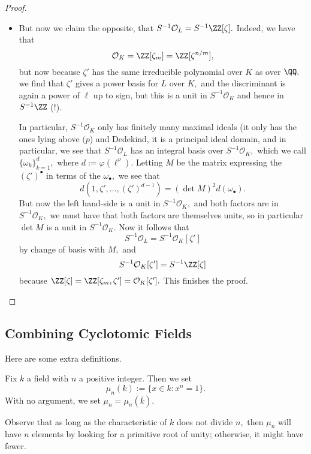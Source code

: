 \documentclass[../notes.tex]{subfiles}
\begin{document}
\begin{proof}
\begin{itemize}
		\item But now we claim the opposite, that $S^{-1}\mathcal O_L=S^{-1}\ZZ[\zeta].$ Indeed, we have that
		\[\mathcal O_K=\ZZ[\zeta_m]=\ZZ[\zeta^{n/m}],\]
		but now because $\zeta'$ has the same irreducible polynomial over $K$ as over $\QQ,$ we find that $\zeta'$ gives a power basis for $L$ over $K,$ and the discriminant is again a power of $\ell$ up to sign, but this is a unit in $S^{-1}\mathcal O_K$ and hence in $S^{-1}\ZZ$ (!).
		
		In particular, $S^{-1}\mathcal O_K$ only has finitely many maximal ideals (it only has the ones lying above $(p$) and Dedekind, it is a principal ideal domain, and in particular, we see that $S^{-1}\mathcal O_L$ has an integral basis over $S^{-1}\mathcal O_K,$ which we call $\{\omega_k\}_{k=1}^d,$ where $d:=\varphi\left(\ell^\nu\right).$ Letting $M$ be the matrix expressing the $(\zeta')^\bullet$ in terms of the $\omega_\bullet,$ we see that
		\[d(1,\zeta',\ldots,(\zeta')^{d-1})=(\det M)^2d(\omega_\bullet).\]
		But now the left hand-side is a unit in $S^{-1}\mathcal O_K,$ and both factors are in $S^{-1}\mathcal O_K,$ we must have that both factors are themselves units, so in particular $\det M$ is a unit in $S^{-1}\mathcal O_K.$ Now it follows that
		\[S^{-1}\mathcal O_L=S^{-1}\mathcal O_K[\zeta']\]
		by change of basis with $M,$ and
		\[S^{-1}\mathcal O_K[\zeta']=S^{-1}\ZZ[\zeta]\]
		because $\ZZ[\zeta]=\ZZ[\zeta_m,\zeta']=\mathcal O_K[\zeta'].$ This finishes the proof.
		\qedhere
	\end{itemize}
\end{proof}

\subsection{Combining Cyclotomic Fields}
Here are some extra definitions.
\begin{definition}
	Fix $k$ a field with $n$ a positive integer. Then we set
	\[\mu_n(k):=\{x\in k:x^n=1\}.\]
	With no argument, we set $\mu_n=\mu_n(\overline k).$
\end{definition}
Observe that as long as the characteristic of $k$ does not divide $n,$ then $\mu_n$ will have $n$ elements by looking for a primitive root of unity; otherwise, it might have fewer.
\end{document}
